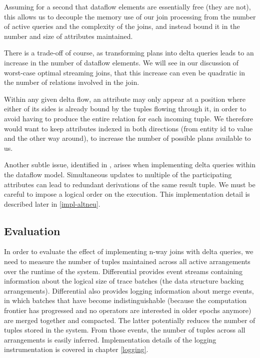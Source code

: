 \documentclass[../catalog.tex]{subfiles}
\begin{document}
Assuming for a second that dataflow elements are essentially free
(they are not), this allows us to decouple the memory use of our join
processing from the number of active queries and the complexity of the
joins, and instead bound it in the number and size of attributes
maintained.

There is a trade-off of course, as transforming plans into delta
queries leads to an increase in the number of dataflow elements. We
will see in our discussion of worst-case optimal streaming joins, that
this increase can even be quadratic in the number of relations
involved in the join.

Within any given delta flow, an attribute may only appear at a
position where either of its sides is already bound by the tuples
flowing through it, in order to avoid having to produce the entire
relation for each incoming tuple. We therefore would want to keep
attributes indexed in both directions (from entity id to value and the
other way around), to increase the number of possible plans available
to us.

Another subtle issue, identified in \cite{dogsdogsdogs}, arises when
implementing delta queries within the dataflow model. Simultaneous
updates to multiple of the participating attributes can lead to
redundant derivations of the same result tuple. We must be careful to
impose a logical order on the execution. This implementation detail is
described later in \autoref{impl-altneu}.

\subsection{Evaluation}

In order to evaluate the effect of implementing n-way joins with delta
queries, we need to measure the number of tuples maintained across all
active arrangements over the runtime of the system. Differential
provides event streams containing information about the logical size
of trace batches (the data structure backing
arrangements). Differential also provides logging information about
merge events, in which batches that have become indistinguishable
(because the computation frontier has progressed and no operators are
interested in older epochs anymore) are merged together and
compacted. The latter potentially reduces the number of tuples stored
in the system. From those events, the number of tuples across all
arrangements is easily inferred. Implementation details of the logging
instrumentation is covered in chapter \ref{logging}.
\end{document}
